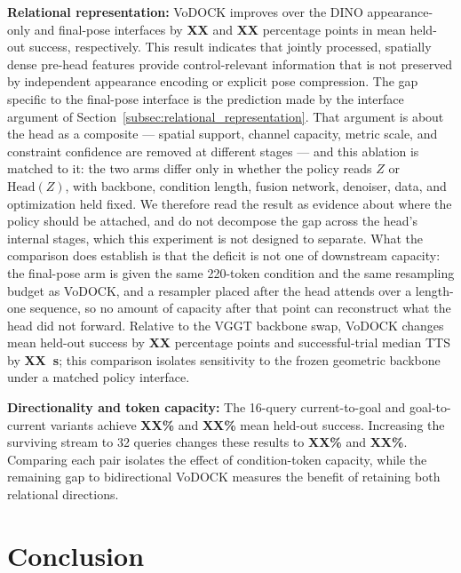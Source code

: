 \documentclass[letterpaper, 10 pt, conference]{IEEEtran}  %
\begin{document}
\textbf{Relational representation:}
VoDOCK improves over the DINO appearance-only and final-pose interfaces by \textbf{XX} and \textbf{XX} percentage points in mean held-out success, respectively. This result indicates that jointly processed, spatially dense pre-head features provide control-relevant information that is not preserved by independent appearance encoding or explicit pose compression. The gap specific to the final-pose interface is the prediction made by the interface argument of Section~\ref{subsec:relational_representation}. That argument is about the head as a composite --- spatial support, channel capacity, metric scale, and constraint confidence are removed at different stages --- and this ablation is matched to it: the two arms differ only in whether the policy reads $Z$ or $\mathrm{Head}(Z)$, with backbone, condition length, fusion network, denoiser, data, and optimization held fixed. We therefore read the result as evidence about where the policy should be attached, and do not decompose the gap across the head's internal stages, which this experiment is not designed to separate. What the comparison does establish is that the deficit is not one of downstream capacity: the final-pose arm is given the same 220-token condition and the same resampling budget as VoDOCK, and a resampler placed after the head attends over a length-one sequence, so no amount of capacity after that point can reconstruct what the head did not forward. Relative to the VGGT backbone swap, VoDOCK changes mean held-out success by \textbf{XX} percentage points and successful-trial median TTS by \textbf{XX~s}; this comparison isolates sensitivity to the frozen geometric backbone under a matched policy interface.

\textbf{Directionality and token capacity:}
The 16-query current-to-goal and goal-to-current variants achieve \textbf{XX\%} and \textbf{XX\%} mean held-out success. Increasing the surviving stream to 32 queries changes these results to \textbf{XX\%} and \textbf{XX\%}. Comparing each pair isolates the effect of condition-token capacity, while the remaining gap to bidirectional VoDOCK measures the benefit of retaining both relational directions.

\section{Conclusion}
\label{sec:conclusion}
\end{document}
